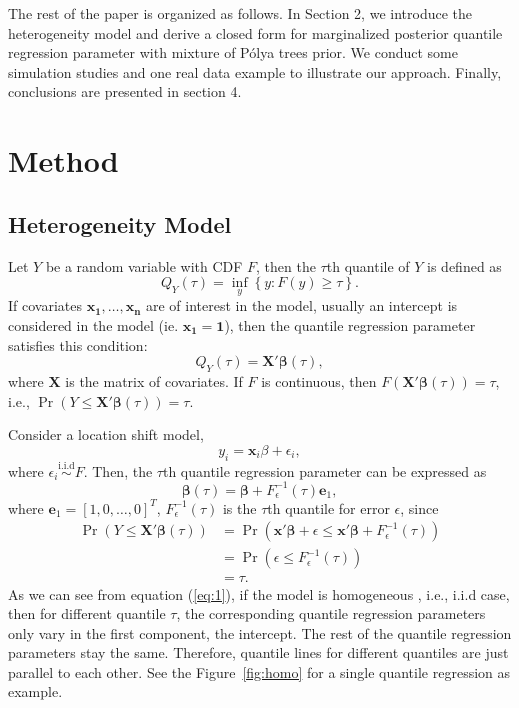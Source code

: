 \documentclass[12pt]{article}
\newcommand{\polya}{P\'{o}lya}
\DeclareMathOperator{\pr}{Pr}
\begin{document}
The rest of the paper is organized as follows. In Section 2, we
introduce the heterogeneity model and derive a closed form for
marginalized posterior quantile regression parameter with mixture of
\polya{} trees prior. We conduct some simulation studies and one real
data example to illustrate our approach. Finally, conclusions are
presented in section 4. 

\section{Method}
\subsection{Heterogeneity Model}
Let $Y$ be a random variable with CDF $F$, then the $\tau$th quantile
of $Y$ is defined as 
\begin{displaymath}
  Q_Y(\tau) = \underset{y}{\inf} \left\{ y: F(y) \ge \tau \right\}.
\end{displaymath}
If covariates $\bm{x_1, \ldots, x_n}$ are of interest in the model,
usually an intercept is considered in the model (ie. $\bm{x_1}=
\bm{1}$), then the quantile regression parameter satisfies this
condition: 
\begin{displaymath}
  Q_Y(\tau) = \bm{X'\beta}(\tau),
\end{displaymath}
where $\bm{X}$ is the matrix of covariates. If $F$ is continuous, then
$F(\bm{X'\beta}(\tau)) = \tau$, i.e., $\pr(Y \le \bm{X'\beta}(\tau)) =
\tau$. 

Consider a location shift model, 
\begin{displaymath}
  y_i = \bm{x}_i\beta + \epsilon_i, 
\end{displaymath}
where $\epsilon_i \stackrel{\text{i.i.d}}{\sim} F$. Then, the $\tau$th
quantile regression parameter can be expressed as 
\begin{equation}
\label{eq:1}
  \bm{\beta}(\tau) = \bm{\beta} + F^{-1}_{\epsilon}(\tau) \bm{e}_1,
\end{equation}
where $\bm{e}_1 = [1, 0, \ldots, 0]^T$, $F^{-1}_{\epsilon}(\tau)$ is
the $\tau$th quantile for error $\epsilon$, since 
\begin{align*}
\pr (Y \le \bm{X'\beta}(\tau)) & = \pr \left( \bm{x'\beta} + \epsilon
  \le \bm{x'\beta} + F^{-1}_{\epsilon}(\tau) \right) \\
& = \pr (\epsilon \le F^{-1}_{\epsilon}(\tau)) \\
& = \tau. 
\end{align*}
As we can see from equation (\ref{eq:1}), if the model is homogeneous
, i.e., i.i.d case, then for different quantile $\tau$, the
corresponding quantile regression parameters only vary in the
first component, the intercept. The rest of the quantile regression
parameters stay the same. Therefore, quantile lines for different quantiles are
just parallel to each other. See the Figure~\ref{fig:homo} for a single quantile
regression as example. 
\end{document}
